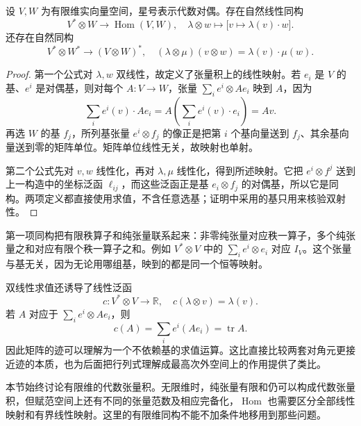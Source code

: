 \begin{proposition}\label{b1:prop:app-b-tensor-hom}
设 \(V,W\) 为有限维实向量空间，星号表示代数对偶。存在自然线性同构
\[
 V^*\otimes W\longrightarrow\operatorname{Hom}(V,W),
 \quad \lambda\otimes w\longmapsto
      \bigl[v\longmapsto\lambda(v)\cdot w\bigr].
\]
还存在自然同构
\[
 V^*\otimes W^*\longrightarrow (V\otimes W)^*,
 \quad
 (\lambda\otimes\mu)(v\otimes w)=\lambda(v)\cdot\mu(w).
\]
\end{proposition}
\begin{proof}
第一个公式对 \(\lambda,w\) 双线性，故定义了张量积上的线性映射。若 \(e_i\) 是 \(V\) 的基、\(e^i\) 是对偶基，则对每个 \(A:V\rightarrow W\)，张量
\(\sum_i e^i\otimes Ae_i\) 映到 \(A\)，因为
\[
 \sum_i e^i(v)\cdot Ae_i=A\left(\sum_i e^i(v)\cdot e_i\right)=Av.
\]
再选 \(W\) 的基 \(f_j\)，所列基张量 \(e^i\otimes f_j\) 的像正是把第 \(i\) 个基向量送到 \(f_j\)、其余基向量送到零的矩阵单位。矩阵单位线性无关，故映射也单射。

第二个公式先对 \(v,w\) 线性化，再对 \(\lambda,\mu\) 线性化，得到所述映射。它把 \(e^i\otimes f^j\) 送到上一构造中的坐标泛函 \(\ell_{ij}\)，而这些泛函正是基 \(e_i\otimes f_j\) 的对偶基，所以它是同构。两项定义都直接使用求值，不含任意选基；证明中采用的基只用来核验双射性。
\end{proof}

第一项同构把有限秩算子和纯张量联系起来：非零纯张量对应秩一算子，多个纯张量之和对应有限个秩一算子之和。例如 \(V^*\otimes V\) 中的 \(\sum_i e^i\otimes e_i\) 对应 \(I_V\)。这个张量与基无关，因为无论用哪组基，映到的都是同一个恒等映射。

\ProseParagraphBreak

双线性求值还诱导了线性泛函
\[
 c:V^*\otimes V\longrightarrow\mathbb R,\quad
 c(\lambda\otimes v)=\lambda(v).
\]
若 \(A\) 对应于 \(\sum_i e^i\otimes Ae_i\)，则
\[
 c(A)=\sum_i e^i(Ae_i)=\operatorname{tr}A.
\]
因此矩阵的迹可以理解为一个不依赖基的求值运算。这比直接比较两套对角元更接近迹的本质，也为后面把行列式理解成最高次外空间上的作用提供了类比。

\ProseParagraphBreak

本节始终讨论有限维的代数张量积。无限维时，纯张量有限和仍可以构成代数张量积，但赋范空间上还有不同的张量范数及相应完备化，\(\operatorname{Hom}\) 也需要区分全部线性映射和有界线性映射。这里的有限维同构不能不加条件地移用到那些问题。
